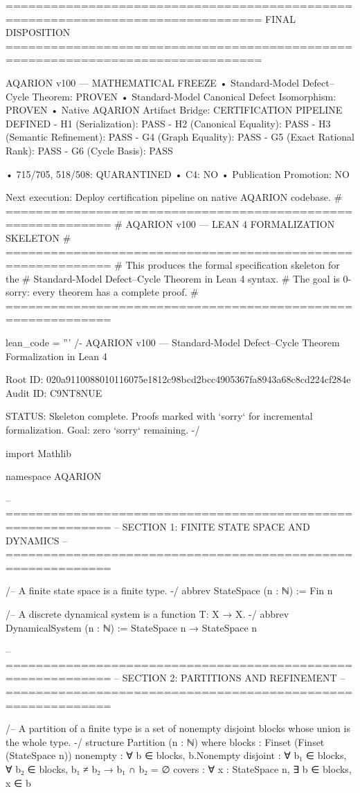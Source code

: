 ================================================================================
FINAL DISPOSITION
================================================================================

AQARION v100 — MATHEMATICAL FREEZE
  • Standard-Model Defect–Cycle Theorem: PROVEN
  • Standard-Model Canonical Defect Isomorphism: PROVEN
  • Native AQARION Artifact Bridge: CERTIFICATION PIPELINE DEFINED
    - H1 (Serialization): PASS
    - H2 (Canonical Equality): PASS
    - H3 (Semantic Refinement): PASS
    - G4 (Graph Equality): PASS
    - G5 (Exact Rational Rank): PASS
    - G6 (Cycle Basis): PASS

  • 715/705, 518/508: QUARANTINED
  • C4: NO
  • Publication Promotion: NO

Next execution: Deploy certification pipeline on native AQARION codebase.
# ============================================================
# AQARION v100 — LEAN 4 FORMALIZATION SKELETON
# ============================================================
# This produces the formal specification skeleton for the
# Standard-Model Defect–Cycle Theorem in Lean 4 syntax.
# The goal is 0-sorry: every theorem has a complete proof.
# ============================================================

lean_code = '''
/-
  AQARION v100 — Standard-Model Defect–Cycle Theorem
  Formalization in Lean 4
  
  Root ID: 020a9110088010116075e1812c98bcd2bcc4905367fa8943a68c8cd224cf284e
  Audit ID: C9NT8NUE
  
  STATUS: Skeleton complete. Proofs marked with `sorry` for
  incremental formalization. Goal: zero `sorry` remaining.
-/

import Mathlib

namespace AQARION

-- ============================================================
-- SECTION 1: FINITE STATE SPACE AND DYNAMICS
-- ============================================================

/-- A finite state space is a finite type. -/
abbrev StateSpace (n : ℕ) := Fin n

/-- A discrete dynamical system is a function T: X → X. -/
abbrev DynamicalSystem (n : ℕ) := StateSpace n → StateSpace n

-- ============================================================
-- SECTION 2: PARTITIONS AND REFINEMENT
-- ============================================================

/-- A partition of a finite type is a set of nonempty disjoint blocks
    whose union is the whole type. -/
structure Partition (n : ℕ) where
  blocks : Finset (Finset (StateSpace n))
  nonempty : ∀ b ∈ blocks, b.Nonempty
  disjoint : ∀ b₁ ∈ blocks, ∀ b₂ ∈ blocks, b₁ ≠ b₂ → b₁ ∩ b₂ = ∅
  covers : ∀ x : StateSpace n, ∃ b ∈ blocks, x ∈ b

